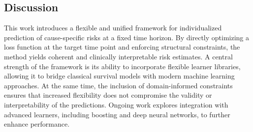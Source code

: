 \documentclass[11pt]{article}
\begin{document}
\subsection{Discussion}
\label{sec:orgeb558e5}
This work introduces a flexible and unified framework for individualized prediction of cause-specific risks at a fixed time horizon. By directly optimizing a loss function at the target time point and enforcing structural constraints, the method yields coherent and clinically interpretable risk estimates. A central strength of the framework is its ability to incorporate flexible learner libraries, allowing it to bridge classical survival models with modern machine learning approaches. At the same time, the inclusion of domain-informed constraints ensures that increased flexibility does not compromise the validity or interpretability of the predictions. Ongoing work explores integration with advanced learners, including boosting and deep neural networks, to further enhance performance.
\end{document}

